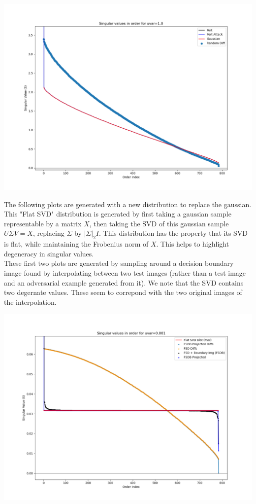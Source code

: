 \documentclass[10pt]{extarticle}
\begin{document}
\includegraphics[width=14cm]{img/SVD-rand_diff-decision_boundary_uvar-1.0-index-0-image-999.png}

The following plots are generated with a new distribution to replace the gaussian. This "Flat SVD" distribution is generated by first taking a gaussian sample representable by a matrix $X$, then taking the SVD of this gaussian sample $U \Sigma V = X$, replacing $\Sigma$ by $|\Sigma|_2 I$. This distribution has the property that its SVD is flat, while maintaining the Frobenius norm of $X$. This helps to highlight degeneracy in singular values. \\

These first two plots are generated by sampling around a decision boundary image found by interpolating between two test images (rather than a test image and an adversarial example generated from it). We note that the SVD contains two degernate values. These seem to correpond with the two original images of the interpolation. 

\includegraphics[width=14cm]{img/e05-SVD-uniform-rand_diff-decision_boundary_uvar-0.001-index-0-image-999.png}
\end{document}
